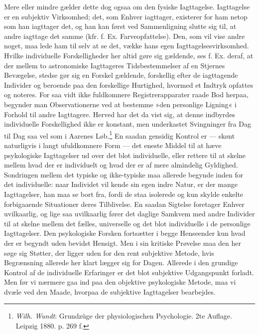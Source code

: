 \documentclass[12pt,a4paper,openany]{book}
\newcommand{\opage}[1]{\marginnote{\footnotesize\textit{[#1]}}}
\begin{document}
Mere eller mindre gælder dette dog ogsaa om den fysiske Iagttagelse.
Iagttagelse er en subjektiv Virksomhed; det, som Enhver iagttager,
existerer for ham netop som han iagttager det, og han kan først ved
Sammenligning slutte sig til, at andre iagttage det samme (kfr. f. Ex.
Farveopfattelse). Den, som vil vise andre noget, maa lede ham til selv
at se det, vække hans egen Iagttagelsesvirksomhed. Hvilke individuelle
Forskelligheder her altid gøre sig gældende, ses f. Ex. deraf, at der
mellem to astronomiske Iagttageres Tidsbestemmelser af en Stjernes
Bevægelse, stedse gør sig en Forskel gældende, forskellig efter de
iagttagende Individer og beroende paa den forskellige Hurtighed, hvormed
et Indtryk opfattes og noteres. For saa vidt ikke fuldkomnere
Registrerapparater raade Bod herpaa, begynder man Observationerne ved at
bestemme »den personlige Ligning« i Forhold til andre Iagttagere. Herved
har det da vist sig, at denne indbyrdes individuelle Forskellighed ikke
er konstant, men underkastet Svingninger fra Dag til Dag saa vel som i
Aarenes Løb.\footnote[1]{\emph{Wilh. Wundt}: Grundzüge der
physiologischen Psychologie. 2te Auflage. Leipzig 1880. p. 269 f.} En
saadan gensidig
\opage{22}Kontrol er --- skønt naturligvis i langt ufuldkomnere Form ---
det eneste Middel til at hæve psykologiske Iagttagelser ud over det blot
individuelle, eller rettere til at skelne mellem hvad der er individuelt
og hvad der er af mere almindelig Gyldighed. Sondringen mellem det
typiske og ikke-typiske maa allerede begynde inden for det individuelle:
naar Individet vil kende sin egen indre Natur, er der mange
Iagttagelser, han maa se bort fra, fordi de staa isolerede og kun skylde
enkelte forbigaaende Situationer deres Tilblivelse. En saadan Sigtelse
foretager Enhver uvilkaarlig, og lige saa uvilkaarlig fører det daglige
Samkvem med andre Individer til at skelne mellem det fælles, universelle
og det blot individuelle i de personlige Iagttagelser. Den psykologiske
Forsken fortsætter i begge Henseender kun hvad der er begyndt uden
bevidst Hensigt. Men i sin kritiske Prøvelse maa den her søge sig
Støtter, der ligger uden for den rent subjektive Metode, hvis
Begrænsning allerede her klart lægger sig for Dagen. Allerede i den
grundige Kontrol af de individuelle Erfaringer er det blot subjektive
Udgangspunkt forladt. Men før vi nærmere gaa ind paa den objektive
psykologiske Metode, maa vi dvæle ved den Maade, hvorpaa de subjektive
Iagttagelser bearbejdes.
\end{document}
